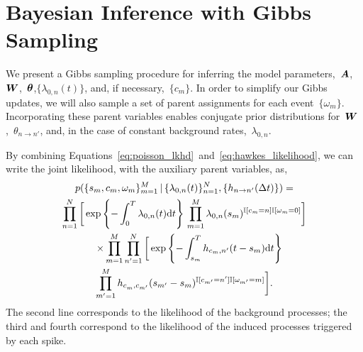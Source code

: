 \section{Bayesian Inference with Gibbs Sampling}
We present a Gibbs sampling procedure for inferring the model
parameters,~$\boldsymbol{A}$,~$\boldsymbol{W}$,~$\boldsymbol{\theta}$,$\{\lambda_{0,n}(t)\}$, and, if
necessary,~${\{c_m\}}$. In order to simplify our Gibbs updates, we
will also sample a set of parent assignments for each
event~$\{\omega_m\}$. Incorporating these parent variables enables
conjugate prior distributions for~$\boldsymbol{W}$,~$\theta_{n \to n'}$, and, in
the case of constant background rates,~$\lambda_{0,n}$.

By combining
Equations~\ref{eq:poisson_lkhd}~and~\ref{eq:hawkes_likelihood}, we can
write the joint likelihood, with the auxiliary parent variables, as,
\begin{multline}
  \label{eq:complete_likelihood}
  p(\{s_m, c_m, \omega_m\}_{m=1}^M \,|\, \{\lambda_{0,n}(t)\}_{n=1}^N, \{h_{n \to n'}(\Delta t)\}) = \\
  \prod^N_{n=1} \bigg[
  \exp\left\{ -\int_0^T \lambda_{0,n}(t)\mathrm{d}t \right\} \,
  \prod^M_{m=1}
   \lambda_{0,n}(s_m)^{\mathbb{I}[c_m=n] \mathbb{I}[\omega_m = 0]} \bigg]\\
  \quad\times \prod_{m=1}^M \prod_{n'=1}^N \bigg[
  \exp\left\{-\int^T_{s_m} h_{c_m,n'}(t - s_m) \mathrm{d}t \right\} \\
  \prod_{m'=1}^M h_{c_m^{~},c_{m'}}(s_{m'}-s_m)^{\mathbb{I}[c_{m'}=n'] \mathbb{I}[\omega_{m'}=m]}\bigg].
\end{multline}
The second line corresponds to the likelihood of the background
processes; the third and fourth correspond to the likelihood of the
induced processes triggered by each spike.

